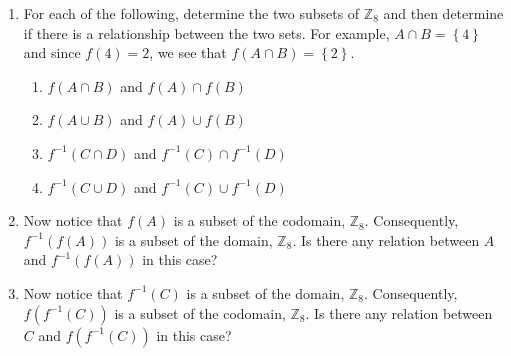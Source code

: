 \begin{prog}
\begin{enumerate}
\item For each of the following, determine the two subsets of $\mathbb{Z}_8$ and then determine if there is a relationship between the two sets.  For example,  
$A \cap B = \left\{ 4 \right\}$ and since $f(4) = 2$, we see that 
$f ( A \cap B ) = \left\{ 2 \right\}$.
\begin{enumerate}
\item $f ( A \cap B )$ and $f ( A ) \cap f ( B )$
\item $f ( A \cup B )$ and $f ( A ) \cup f ( B )$
\item $f^{-1} ( C \cap D )$ and $f^{-1} ( C ) \cap f^{-1} ( D )$
\item $f^{-1} ( C \cup D )$ and $f^{-1} ( C ) \cup f^{-1} ( D )$
\end{enumerate}

\item Now notice that $f ( A )$ is a subset of the codomain, $\mathbb{Z}_8$.  Consequently, 
\linebreak
$f^{-1} \!\left( f ( A ) \right)$ is a subset of the domain, 
$\mathbb{Z}_8$.  Is there any relation between $A$ and $f^{-1} \!\left( f ( A ) \right)$ in this case?

\item Now notice that $f^{-1} ( C )$ is a subset of the domain, $\mathbb{Z}_8$.  Consequently, 
\linebreak
$f \!\left( f^{-1} ( C ) \right)$ is a subset of the codomain, 
$\mathbb{Z}_8$.  Is there any relation between $C$ and $f \!\left( f^{-1} ( C ) \right)$ in this case?
\end{enumerate}
\end{prog}
\hbreak

